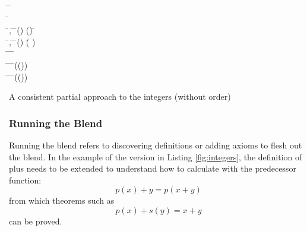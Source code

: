 \begin{listing}[!ht]
\begin{mdframed}
\begin{hetcasl}
\> \OP \= \Ax{:} \= \Ax{\rightarrow} \\
\> \OP \= \Ax{:} \\
\> \Ax{\forall} \=,  \Ax{:}  \=\Ax{\bullet}
\=() \Ax{=} () \Ax{\Rightarrow} \= \Ax{=}
\\%
\> \Ax{\forall} \=,  \Ax{:}  \=\Ax{\bullet}
\=() \Ax{+}  \Ax{=} (\= \Ax{+} )\\%
\> \Ax{\forall} \= \Ax{:}  \=\Ax{\bullet} \= \Ax{+}
 \Ax{=} \\%
\> \Ax{\forall} \= \Ax{:}  \=\Ax{\bullet}
\=(()) \Ax{=} \\%
\> \Ax{\forall} \= \Ax{:}  \=\Ax{\bullet}
\=(()) \Ax{=} \\%
\end{hetcasl}
\end{mdframed}
\caption{A consistent partial approach to the integers (without order)}
\label{fig:integers}
\end{listing}

\subsubsection{Running the Blend}

Running the blend refers to discovering definitions or adding axioms
to flesh out the blend.  In the example of the version in Listing
\ref{fig:integers}, the definition of plus needs to be extended to
understand how to calculate with the predecessor function:
$$
p(x) + y = p(x+y)
$$
\noindent from which theorems such as 
$$
p(x) + s(y) = x+y
$$
\noindent can be proved.



